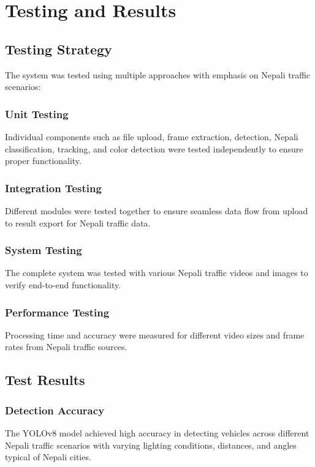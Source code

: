 \documentclass[12pt,a4paper]{report}
\begin{document}
\chapter{Testing and Results}

\section{Testing Strategy}
The system was tested using multiple approaches with emphasis on Nepali traffic scenarios:

\subsection{Unit Testing}
Individual components such as file upload, frame extraction, detection, Nepali classification, tracking, and color detection were tested independently to ensure proper functionality.

\subsection{Integration Testing}
Different modules were tested together to ensure seamless data flow from upload to result export for Nepali traffic data.

\subsection{System Testing}
The complete system was tested with various Nepali traffic videos and images to verify end-to-end functionality.

\subsection{Performance Testing}
Processing time and accuracy were measured for different video sizes and frame rates from Nepali traffic sources.

\section{Test Results}

\subsection{Detection Accuracy}
The YOLOv8 model \cite{ultralytics2023yolov8} achieved high accuracy in detecting vehicles across different Nepali traffic scenarios with varying lighting conditions, distances, and angles typical of Nepali cities.
\end{document}
